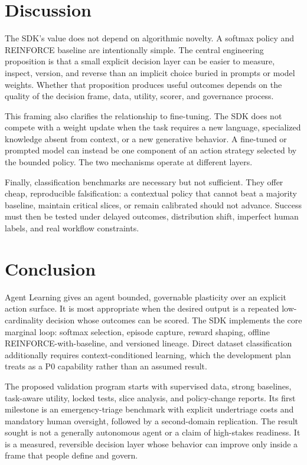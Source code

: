\documentclass[conference]{IEEEtran}
\begin{document}
\section{Discussion}
\label{sec:discussion}

The SDK's value does not depend on algorithmic novelty. A softmax
policy and REINFORCE baseline are intentionally simple. The central
engineering proposition is that a small explicit decision layer can
be easier to measure, inspect, version, and reverse than an implicit
choice buried in prompts or model weights. Whether that proposition
produces useful outcomes depends on the quality of the decision
frame, data, utility, scorer, and governance process.

This framing also clarifies the relationship to fine-tuning. The SDK
does not compete with a weight update when the task requires a new
language, specialized knowledge absent from context, or a new
generative behavior. A fine-tuned or prompted model can instead be
one component of an action strategy selected by the bounded policy.
The two mechanisms operate at different layers.

Finally, classification benchmarks are necessary but not sufficient.
They offer cheap, reproducible falsification: a contextual policy that
cannot beat a majority baseline, maintain critical slices, or remain
calibrated should not advance. Success must then be tested under
delayed outcomes, distribution shift, imperfect human labels, and
real workflow constraints.

\section{Conclusion}
\label{sec:conclusion}

Agent Learning gives an agent bounded, governable plasticity over an
explicit action surface. It is most appropriate when the desired
output is a repeated low-cardinality decision whose outcomes can be
scored. The SDK implements the core marginal loop: softmax selection,
episode capture, reward shaping, offline REINFORCE-with-baseline, and
versioned lineage. Direct dataset classification additionally
requires context-conditioned learning, which the development plan
treats as a P0 capability rather than an assumed result.

The proposed validation program starts with supervised data, strong
baselines, task-aware utility, locked tests, slice analysis, and
policy-change reports. Its first milestone is an emergency-triage
benchmark with explicit undertriage costs and mandatory human
oversight, followed by a second-domain replication. The result sought
is not a generally autonomous agent or a claim of high-stakes
readiness. It is a measured, reversible decision layer whose behavior
can improve only inside a frame that people define and govern.



\end{document}
